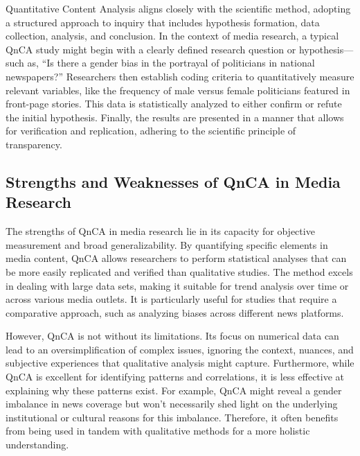 \documentclass[
  b5paper]{book}
\begin{document}
Quantitative Content Analysis aligns closely with the scientific method, adopting a structured approach to inquiry that includes hypothesis formation, data collection, analysis, and conclusion. In the context of media research, a typical QnCA study might begin with a clearly defined research question or hypothesis---such as, ``Is there a gender bias in the portrayal of politicians in national newspapers?'' Researchers then establish coding criteria to quantitatively measure relevant variables, like the frequency of male versus female politicians featured in front-page stories. This data is statistically analyzed to either confirm or refute the initial hypothesis. Finally, the results are presented in a manner that allows for verification and replication, adhering to the scientific principle of transparency.

\hypertarget{strengths-and-weaknesses-of-qnca-in-media-research}{%
\subsection*{Strengths and Weaknesses of QnCA in Media Research}\label{strengths-and-weaknesses-of-qnca-in-media-research}}

The strengths of QnCA in media research lie in its capacity for objective measurement and broad generalizability. By quantifying specific elements in media content, QnCA allows researchers to perform statistical analyses that can be more easily replicated and verified than qualitative studies. The method excels in dealing with large data sets, making it suitable for trend analysis over time or across various media outlets. It is particularly useful for studies that require a comparative approach, such as analyzing biases across different news platforms.

However, QnCA is not without its limitations. Its focus on numerical data can lead to an oversimplification of complex issues, ignoring the context, nuances, and subjective experiences that qualitative analysis might capture. Furthermore, while QnCA is excellent for identifying patterns and correlations, it is less effective at explaining why these patterns exist. For example, QnCA might reveal a gender imbalance in news coverage but won't necessarily shed light on the underlying institutional or cultural reasons for this imbalance. Therefore, it often benefits from being used in tandem with qualitative methods for a more holistic understanding.
\end{document}
